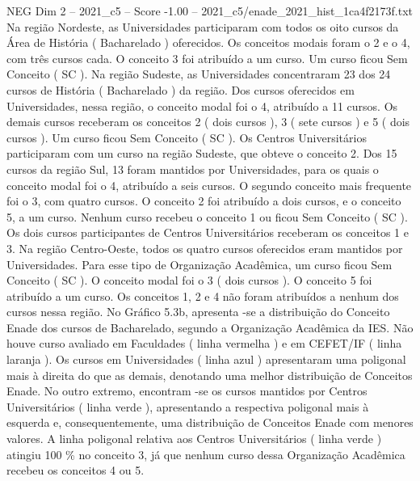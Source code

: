 \begin{textsample}{NEG Dim 2 – 2021\_c5 – Score -1.00 – 2021\_c5/enade\_2021\_hist\_1ca4f2173f.txt}
Na região Nordeste, as Universidades participaram com todos os oito cursos da Área de História ( Bacharelado ) oferecidos.
Os conceitos modais foram o 2 e o 4, com três cursos cada.
O conceito 3 foi atribuído a um curso.
Um curso ficou Sem Conceito ( SC ).
Na região Sudeste, as Universidades concentraram 23 dos 24 cursos de História ( Bacharelado ) da região.
Dos cursos oferecidos em Universidades, nessa região, o conceito modal foi o 4, atribuído a 11 cursos.
Os demais cursos receberam os conceitos 2 ( dois cursos ), 3 ( sete cursos ) e 5 ( dois cursos ).
Um curso ficou Sem Conceito ( SC ).
Os Centros Universitários participaram com um curso na região Sudeste, que obteve o conceito 2.
Dos 15 cursos da região Sul, 13 foram mantidos por Universidades, para os quais o conceito modal foi o 4, atribuído a seis cursos.
O segundo conceito mais frequente foi o 3, com quatro cursos.
O conceito 2 foi atribuído a dois cursos, e o conceito 5, a um curso.
Nenhum curso recebeu o conceito 1 ou ficou Sem Conceito ( SC ).
Os dois cursos participantes de Centros Universitários receberam os conceitos 1 e 3.
Na região Centro-Oeste, todos os quatro cursos oferecidos eram mantidos por Universidades.
Para esse tipo de Organização Acadêmica, um curso ficou Sem Conceito ( SC ).
O conceito modal foi o 3 ( dois cursos ).
O conceito 5 foi atribuído a um curso.
Os conceitos 1, 2 e 4 não foram atribuídos a nenhum dos cursos nessa região.
No Gráfico 5.3b, apresenta -se a distribuição do Conceito Enade dos cursos de Bacharelado, segundo a Organização Acadêmica da IES.
Não houve curso avaliado em Faculdades ( linha vermelha ) e em CEFET/IF ( linha laranja ).
Os cursos em Universidades ( linha azul ) apresentaram uma poligonal mais à direita do que as demais, denotando uma melhor distribuição de Conceitos Enade.
No outro extremo, encontram -se os cursos mantidos por Centros Universitários ( linha verde ), apresentando a respectiva poligonal mais à esquerda e, consequentemente, uma distribuição de Conceitos Enade com menores valores.
A linha poligonal relativa aos Centros Universitários ( linha verde ) atingiu 100 \% no conceito 3, já que nenhum curso dessa Organização Acadêmica recebeu os conceitos 4 ou 5.

\end{textsample}
